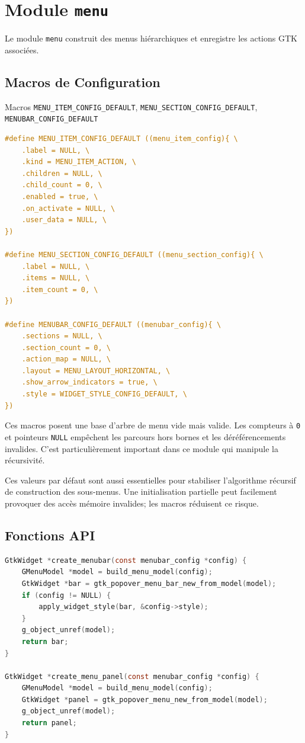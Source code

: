 \section{Module \texttt{menu}}

Le module \texttt{menu} construit des menus hiérarchiques et enregistre les actions GTK associées.

\subsection{Macros de Configuration}

\begin{docbox}{Macros \texttt{MENU\_ITEM\_CONFIG\_DEFAULT}, \texttt{MENU\_SECTION\_CONFIG\_DEFAULT}, \texttt{MENUBAR\_CONFIG\_DEFAULT}}
\begin{lstlisting}[language=C]
#define MENU_ITEM_CONFIG_DEFAULT ((menu_item_config){ \
    .label = NULL, \
    .kind = MENU_ITEM_ACTION, \
    .children = NULL, \
    .child_count = 0, \
    .enabled = true, \
    .on_activate = NULL, \
    .user_data = NULL, \
})

#define MENU_SECTION_CONFIG_DEFAULT ((menu_section_config){ \
    .label = NULL, \
    .items = NULL, \
    .item_count = 0, \
})

#define MENUBAR_CONFIG_DEFAULT ((menubar_config){ \
    .sections = NULL, \
    .section_count = 0, \
    .action_map = NULL, \
    .layout = MENU_LAYOUT_HORIZONTAL, \
    .show_arrow_indicators = true, \
    .style = WIDGET_STYLE_CONFIG_DEFAULT, \
})
\end{lstlisting}
\end{docbox}

Ces macros posent une base d'arbre de menu vide mais valide. Les compteurs à \texttt{0} et pointeurs \texttt{NULL} empêchent les parcours hors bornes et les déréférencements invalides. C'est particulièrement important dans ce module qui manipule la récursivité.

Ces valeurs par défaut sont aussi essentielles pour stabiliser l'algorithme récursif de construction des sous-menus. Une initialisation partielle peut facilement provoquer des accès mémoire invalides; les macros réduisent ce risque.

\subsection{Fonctions API}

\begin{lstlisting}[language=C]
GtkWidget *create_menubar(const menubar_config *config) {
    GMenuModel *model = build_menu_model(config);
    GtkWidget *bar = gtk_popover_menu_bar_new_from_model(model);
    if (config != NULL) {
        apply_widget_style(bar, &config->style);
    }
    g_object_unref(model);
    return bar;
}

GtkWidget *create_menu_panel(const menubar_config *config) {
    GMenuModel *model = build_menu_model(config);
    GtkWidget *panel = gtk_popover_menu_new_from_model(model);
    g_object_unref(model);
    return panel;
}
\end{lstlisting}

